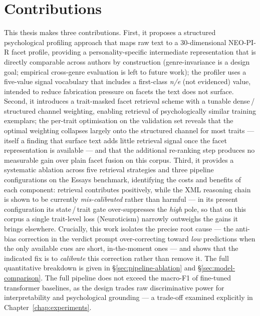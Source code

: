 \documentclass[../main.tex]{subfiles}
\begin{document}
\section{Contributions}
\label{sec:contributions}

This thesis makes three contributions. First, it proposes a structured psychological profiling approach that maps raw text to a 30-dimensional NEO-PI-R facet profile, providing a personality-specific intermediate representation that is directly comparable across authors by construction (genre-invariance is a design goal; empirical cross-genre evaluation is left to future work); the profiler uses a five-value signal vocabulary that includes a first-class \textit{n/e} (not evidenced) value, intended to reduce fabrication pressure on facets the text does not surface. Second, it introduces a trait-masked facet retrieval scheme with a tunable dense\,/\,structured channel weighting, enabling retrieval of psychologically similar training exemplars; the per-trait optimisation on the validation set reveals that the optimal weighting collapses largely onto the structured channel for most traits --- itself a finding that surface text adds little retrieval signal once the facet representation is available --- and that the additional re-ranking step produces no measurable gain over plain facet fusion on this corpus. Third, it provides a systematic ablation across five retrieval strategies and three pipeline configurations on the Essays benchmark, identifying the costs and benefits of each component: retrieval contributes positively, while the XML reasoning chain is shown to be currently \emph{mis-calibrated} rather than harmful --- in its present configuration its state\,/\,trait gate over-suppresses the \textit{high} pole, so that on this corpus a single trait-level loss (Neuroticism) narrowly outweighs the gains it brings elsewhere. Crucially, this work isolates the precise root cause --- the anti-bias correction in the verdict prompt over-correcting toward \textit{low} predictions when the only available cues are short, in-the-moment ones --- and shows that the indicated fix is to \emph{calibrate} this correction rather than remove it. The full quantitative breakdown is given in \S\ref{sec:pipeline-ablation} and \S\ref{sec:model-comparison}. The full pipeline does not exceed the macro-F1 of fine-tuned transformer baselines, as the design trades raw discriminative power for interpretability and psychological grounding --- a trade-off examined explicitly in Chapter~\ref{chap:experiments}.
\end{document}
